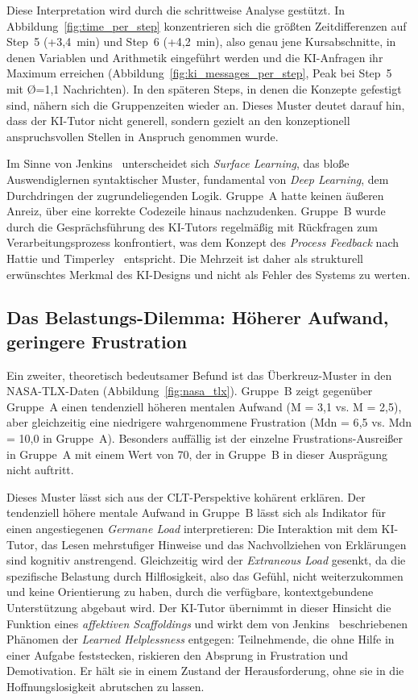 Diese Interpretation wird durch die schrittweise Analyse gestützt. In Abbildung~\ref{fig:time_per_step} konzentrieren sich die größten Zeitdifferenzen auf Step~5 (+3{,}4~min) und Step~6 (+4{,}2~min), also genau jene Kursabschnitte, in denen Variablen und Arithmetik eingeführt werden und die KI-Anfragen ihr Maximum erreichen (Abbildung~\ref{fig:ki_messages_per_step}, Peak bei Step~5 mit Ø=1{,}1 Nachrichten). In den späteren Steps, in denen die Konzepte gefestigt sind, nähern sich die Gruppenzeiten wieder an. Dieses Muster deutet darauf hin, dass der KI-Tutor nicht generell, sondern gezielt an den konzeptionell anspruchsvollen Stellen in Anspruch genommen wurde.

Im Sinne von Jenkins~\cite{jenkins2002} unterscheidet sich \textit{Surface Learning}, das bloße Auswendiglernen syntaktischer Muster, fundamental von \textit{Deep Learning}, dem Durchdringen der zugrundeliegenden Logik. Gruppe~A hatte keinen äußeren Anreiz, über eine korrekte Codezeile hinaus nachzudenken. Gruppe~B wurde durch die Gesprächsführung des KI-Tutors regelmäßig mit Rückfragen zum Verarbeitungsprozess konfrontiert, was dem Konzept des \textit{Process Feedback} nach Hattie und Timperley~\cite{hattie2007} entspricht. Die Mehrzeit ist daher als strukturell erwünschtes Merkmal des KI-Designs und nicht als Fehler des Systems zu werten.

\subsection{Das Belastungs-Dilemma: Höherer Aufwand, geringere Frustration}\label{subsec:diskussion_belastung}

Ein zweiter, theoretisch bedeutsamer Befund ist das Überkreuz-Muster in den NASA-TLX-Daten (Abbildung~\ref{fig:nasa_tlx}). Gruppe~B zeigt gegenüber Gruppe~A einen tendenziell höheren mentalen Aufwand (M = 3{,}1 vs. M = 2{,}5), aber gleichzeitig eine niedrigere wahrgenommene Frustration (Mdn = 6{,}5 vs. Mdn = 10{,}0 in Gruppe~A). Besonders auffällig ist der einzelne Frustrations-Ausreißer in Gruppe~A mit einem Wert von 70, der in Gruppe~B in dieser Ausprägung nicht auftritt.

Dieses Muster lässt sich aus der CLT-Perspektive kohärent erklären. Der tendenziell höhere mentale Aufwand in Gruppe~B lässt sich als Indikator für einen angestiegenen \textit{Germane Load} interpretieren: Die Interaktion mit dem KI-Tutor, das Lesen mehrstufiger Hinweise und das Nachvollziehen von Erklärungen sind kognitiv anstrengend. Gleichzeitig wird der \textit{Extraneous Load} gesenkt, da die spezifische Belastung durch Hilflosigkeit, also das Gefühl, nicht weiterzukommen und keine Orientierung zu haben, durch die verfügbare, kontextgebundene Unterstützung abgebaut wird. Der KI-Tutor übernimmt in dieser Hinsicht die Funktion eines \textit{affektiven Scaffoldings} und wirkt dem von Jenkins~\cite{jenkins2002} beschriebenen Phänomen der \textit{Learned Helplessness} entgegen: Teilnehmende, die ohne Hilfe in einer Aufgabe feststecken, riskieren den Absprung in Frustration und Demotivation. Er hält sie in einem Zustand der Herausforderung, ohne sie in die Hoffnungslosigkeit abrutschen zu lassen.

